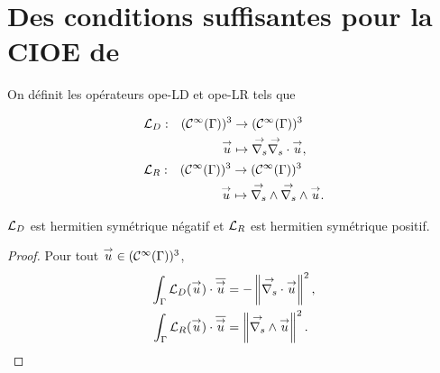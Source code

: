 \section[Des CSU pour la CIOE de Marceaux 2000]{Des conditions suffisantes pour la CIOE de \cite{marceaux_high-order_2000}}

  \begin{defn}
    On définit les opérateurs \gls{ope-LD} et \gls{ope-LR} tels que %

    \begin{equation*}
      \begin{aligned}
        &\fonction{\LD}{(\mathcal{C}^\infty(\Gamma))^3}{(\mathcal{C}^\infty(\Gamma))^3}%
          {\vu}{\vgrads{\vdivs \vu},}
        \\
        &\fonction{\LR}{(\mathcal{C}^\infty(\Gamma))^3}{(\mathcal{C}^\infty(\Gamma))^3}%
          {\vu}{\vrots{\vrots \vu}.}
      \end{aligned}
    \end{equation*}
  \end{defn}

  \begin{prop}
    \({\mathcal{L}_D}\) est hermitien symétrique négatif et \({\mathcal{L}_R}\) est hermitien symétrique positif.
  \end{prop}

  \begin{proof}
    Pour tout \({\overset{\rightarrow}{u}} \in (\mathcal C^\infty(\Gamma))^3\),
    \begin{align*}
      \int_\Gamma {\mathcal{L}_D}({\overset{\rightarrow}{u}})\cdot {\overline{{\overset{\rightarrow}{u}}}} &= -\left\lVert{\overset{\rightarrow}{\nabla_s}} \cdot {\overset{\rightarrow}{u}}\right\rVert^2,
      \\
      \int_\Gamma {\mathcal{L}_R}({\overset{\rightarrow}{u}})\cdot {\overline{{\overset{\rightarrow}{u}}}} &=\left\lVert {\overset{\rightarrow}{\nabla_s}} \wedge {\overset{\rightarrow}{u}}\right\rVert^2.
    \end{align*}
  \end{proof}

